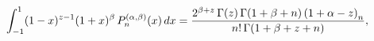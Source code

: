 \[\int_{-1}^{1}(1-x)^{z-1}(1+x)^{\beta}\mathop{P^{(\alpha,\beta)}_{n}\/}%
\nolimits\!\left(x\right)dx=\frac{2^{\beta+z}\mathop{\Gamma\/}\nolimits\!\left%
(z\right)\mathop{\Gamma\/}\nolimits\!\left(1+\beta+n\right)\left(1+\alpha-z%
\right)_{n}}{n!\mathop{\Gamma\/}\nolimits\!\left(1+\beta+z+n\right)},\]